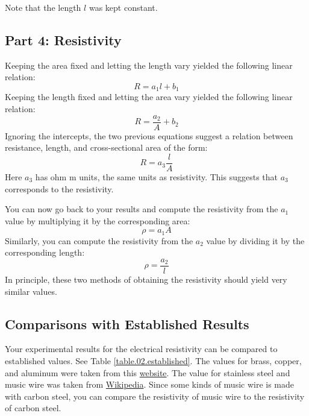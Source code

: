Note that the length $l$ was kept constant.
%
\subsection{Part 4: Resistivity}
%
Keeping the area fixed and letting the length vary yielded the following linear relation:
\begin{equation}
	R = a_{1} l + b_{1}
\end{equation}
Keeping the length fixed and letting the area vary yielded the following linear relation:
\begin{equation}
	R = \frac{a_{2}}{A} + b_{2}
\end{equation}
Ignoring the intercepts, the two previous equations suggest a relation between resistance, length, and cross-sectional area of the form:
\begin{equation}
	R = a_{3} \frac{l}{A}
\end{equation}
Here $a_{3}$ has ohm {\textperiodcentered} m units, the same units as resistivity. This suggests that $a_{3}$ corresponds to the resistivity.

You can now go back to your results and compute the resistivity from the $a_{1}$ value by multiplying it by the corresponding area:
\begin{equation}
	\rho = a_{1} A
\end{equation}
Similarly, you can compute the resistivity from the $a_{2}$ value by dividing it by the corresponding length:
\begin{equation}
	\rho = \frac{a_{2}}{l}
\end{equation}
In principle, these two methods of obtaining the resistivity should yield very similar values.
%
\subsection{Comparisons with Established Results}
%
Your experimental results for the electrical resistivity can be compared to established values. See Table \ref{table.02.established}. The values for brass, copper, and aluminum were taken from this \href{http://www.radio-electronics.com/info/formulae/resistance/resistivity-table.php}{website}. The value for stainless steel and music wire was taken from \href{https://en.wikipedia.org/wiki/Electrical_resistivity_and_conductivity}{Wikipedia}. Since some kinds of music wire is made with carbon steel, you can compare the resistivity of music wire to the resistivity of carbon steel.
%
